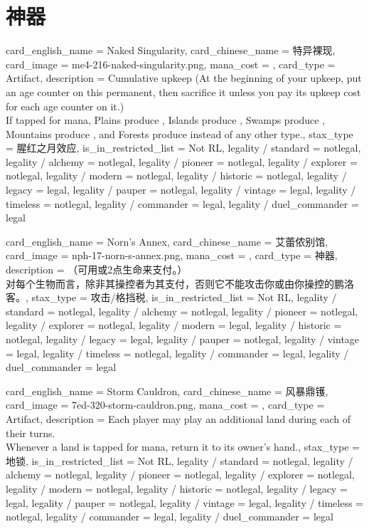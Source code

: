 \documentclass[lang = cn, color = black, 10pt]{AllThatStax}
\begin{document}
\section{神器}

\card
{
	card_english_name = {Naked Singularity},
	card_chinese_name = {特异裸现},
	card_image = me4-216-naked-singularity.png,
	mana_cost = ,
	card_type = Artifact,
	description = {Cumulative upkeep  (At the beginning of your upkeep, put an age counter on this permanent, then sacrifice it unless you pay its upkeep cost for each age counter on it.)\\
		If tapped for mana, Plains produce , Islands produce , Swamps produce , Mountains produce , and Forests produce  instead of any other type.},
	stax_type = 腥红之月效应,
	is_in_restricted_list = Not RL,
	legality / standard = notlegal,
	legality / alchemy = notlegal,
	legality / pioneer = notlegal,
	legality / explorer = notlegal,
	legality / modern = notlegal,
	legality / historic = notlegal,
	legality / legacy = legal,
	legality / pauper = notlegal,
	legality / vintage = legal,
	legality / timeless = notlegal,
	legality / commander = legal,
	legality / duel_commander = legal
}

\card
{
	card_english_name = {Norn's Annex},
	card_chinese_name = {艾蕾侬别馆},
	card_image = nph-17-norn-s-annex.png,
	mana_cost = ,
	card_type = 神器,
	description = {（可用或2点生命来支付。）\\
		对每个生物而言，除非其操控者为其支付，否则它不能攻击你或由你操控的鹏洛客。},
	stax_type = 攻击/格挡税,
	is_in_restricted_list = Not RL,
	legality / standard = notlegal,
	legality / alchemy = notlegal,
	legality / pioneer = notlegal,
	legality / explorer = notlegal,
	legality / modern = legal,
	legality / historic = notlegal,
	legality / legacy = legal,
	legality / pauper = notlegal,
	legality / vintage = legal,
	legality / timeless = notlegal,
	legality / commander = legal,
	legality / duel_commander = legal
}

\card
{
	card_english_name = {Storm Cauldron},
	card_chinese_name = {风暴鼎镬},
	card_image = 7ed-320-storm-cauldron.png,
	mana_cost = ,
	card_type = Artifact,
	description = {Each player may play an additional land during each of their turns.\\
		Whenever a land is tapped for mana, return it to its owner's hand.},
	stax_type = 地锁,
	is_in_restricted_list = Not RL,
	legality / standard = notlegal,
	legality / alchemy = notlegal,
	legality / pioneer = notlegal,
	legality / explorer = notlegal,
	legality / modern = notlegal,
	legality / historic = notlegal,
	legality / legacy = legal,
	legality / pauper = notlegal,
	legality / vintage = legal,
	legality / timeless = notlegal,
	legality / commander = legal,
	legality / duel_commander = legal
}
\end{document}

